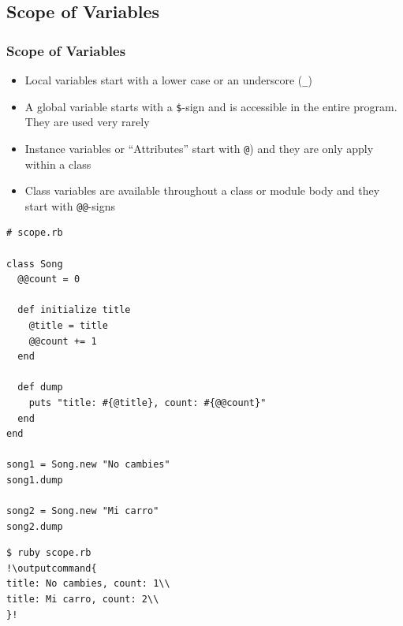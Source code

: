 \documentclass{beamer}
\newcommand{\outputcommand}[1]{\color{darkgreen}{#1}}
\begin{document}
\subsection{Scope of Variables}
\begin{frame}
\frametitle{Scope of Variables}
\begin{itemize}
 \item Local variables start with a lower case or an underscore (\texttt{\_})
 \item A global variable starts with a \texttt{\$}-sign and is accessible in the entire program. They are used very rarely
 \item Instance variables or ``Attributes'' start with \texttt{@}) and they are only apply within a class
 \item Class variables are available throughout a class or module body and they start with  \texttt{@@}-signs
\end{itemize}
\lstset{language=Ruby, style=eclipse}
\begin{lstlisting}[escapechar=&]
# scope.rb

class Song
  @@count = 0

  def initialize title
    @title = title
    @@count += 1
  end

  def dump
    puts "title: #{@title}, count: #{@@count}"
  end
end

song1 = Song.new "No cambies"
song1.dump

song2 = Song.new "Mi carro"
song2.dump
\end{lstlisting}
\lstset{language=shell}
\begin{lstlisting}[numbers=none, escapechar=!]
$ ruby scope.rb 
!\outputcommand{
title: No cambies, count: 1\\
title: Mi carro, count: 2\\
}!
\end{lstlisting}
\end{frame}
\end{document}
